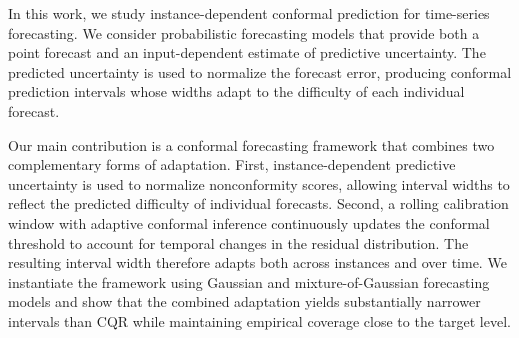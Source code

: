 

In this work, we study instance-dependent conformal prediction for  time-series forecasting. 
We consider probabilistic forecasting models that provide both a point forecast and an input-dependent estimate of predictive uncertainty. The predicted uncertainty is used to normalize the forecast error, producing conformal prediction intervals whose widths adapt to the difficulty of each individual forecast.



Our main contribution is a conformal forecasting framework that combines two complementary forms of adaptation. First, instance-dependent predictive uncertainty is used to normalize nonconformity scores, allowing interval widths to reflect the predicted difficulty of individual forecasts. Second, a rolling calibration window with adaptive conformal inference continuously updates the conformal threshold to account for temporal changes in the residual distribution. The resulting interval width therefore adapts both across instances and over time. We instantiate the framework using Gaussian and mixture-of-Gaussian forecasting models and show that the combined adaptation yields substantially narrower intervals than CQR \cite{cqr2019} while maintaining empirical coverage close to the target level.